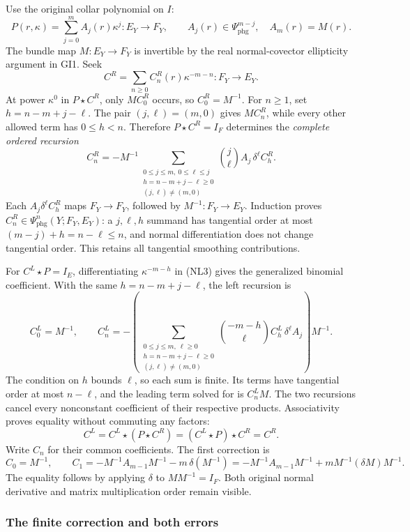 \documentclass[
  11pt,
]{article}
\begin{document}
Use the original collar polynomial on \(I\): \[
 P(r,\kappa)=\sum_{j=0}^{m}A_j(r)\kappa^j:
 E_Y\longrightarrow F_Y,\qquad
 A_j(r)\in\Psi_{\mathrm{phg}}^{m-j},\quad A_m(r)=M(r).
 \tag{NL5}
\] The bundle map \(M:E_Y\to F_Y\) is invertible by the real
normal-covector ellipticity argument in GI1. Seek \[
 C^R=\sum_{n\geq0}C_n^R(r)\kappa^{-m-n}:F_Y\longrightarrow E_Y.
 \tag{NL6}
\] At power \(\kappa^0\) in \(P\star C^R\), only \(MC_0^R\) occurs, so
\(C_0^R=M^{-1}\). For \(n\geq1\), set \(h=n-m+j-\ell\). The pair
\((j,\ell)=(m,0)\) gives \(MC_n^R\), while every other allowed term has
\(0\leq h<n\). Therefore \(P\star C^R=I_F\) determines the
\emph{complete ordered recursion} \[
 C_n^R=-M^{-1}
  \sum_{\substack{0\leq j\leq m,\ 0\leq\ell\leq j\\
                  h=n-m+j-\ell\geq0\\(j,\ell)\ne(m,0)}}
       \binom j\ell A_j\,\delta^\ell C_h^R .
 \tag{NL7}
\] Each \(A_j\delta^\ell C_h^R\) maps \(F_Y\to F_Y\), followed by
\(M^{-1}:F_Y\to E_Y\). Induction proves
\(C_n^R\in\Psi_{\mathrm{phg}}^n(Y;F_Y,E_Y)\): a \(j,\ell,h\) summand has
tangential order at most \((m-j)+h=n-\ell\leq n\), and normal
differentiation does not change tangential order. This retains all
tangential smoothing contributions.

For \(C^L\star P=I_E\), differentiating \(\kappa^{-m-h}\) in (NL3) gives
the generalized binomial coefficient. With the same \(h=n-m+j-\ell\),
the left recursion is \[
 C_0^L=M^{-1},\qquad
 C_n^L=-
 \left(
  \sum_{\substack{0\leq j\leq m,\ \ell\geq0\\
                  h=n-m+j-\ell\geq0\\(j,\ell)\ne(m,0)}}
      \binom{-m-h}{\ell}C_h^L\,\delta^\ell A_j
 \right)M^{-1}.
 \tag{NL8}
\] The condition on \(h\) bounds \(\ell\), so each sum is finite. Its
terms have tangential order at most \(n-\ell\), and the leading term
solved for is \(C_n^L M\). The two recursions cancel every nonconstant
coefficient of their respective products. Associativity proves equality
without commuting any factors: \[
 C^L=C^L\star(P\star C^R)
     =(C^L\star P)\star C^R=C^R.
 \tag{NL9}
\] Write \(C_n\) for their common coefficients. The first correction is
\[
 C_0=M^{-1},\qquad
 C_1=-M^{-1}A_{m-1}M^{-1}-m\,\delta(M^{-1})
     =-M^{-1}A_{m-1}M^{-1}
       +mM^{-1}(\delta M)M^{-1}.
 \tag{NL10}
\] The equality follows by applying \(\delta\) to \(MM^{-1}=I_F\). Both
original normal derivative and matrix multiplication order remain
visible.

\subsubsection{The finite correction and both
errors}\label{the-finite-correction-and-both-errors}
\end{document}
